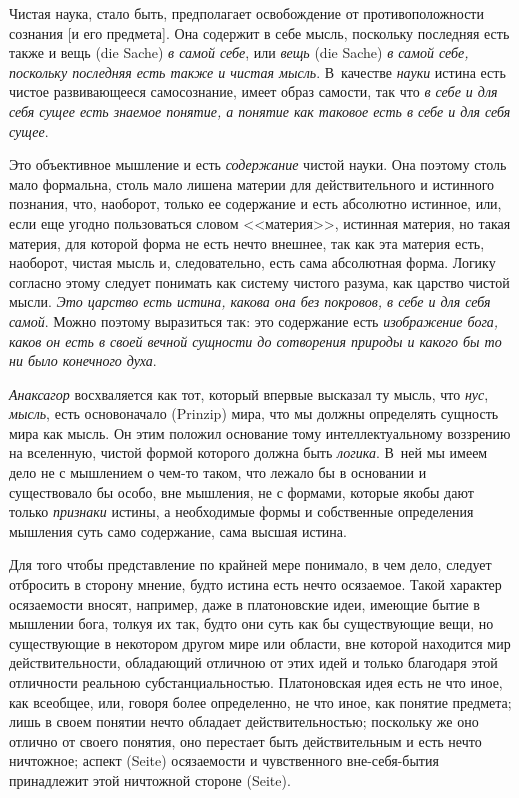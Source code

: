 Чистая наука, стало быть, предполагает освобождение от противоположности
сознания [и его предмета]. Она содержит в себе мысль, поскольку последняя
есть также и вещь (die Sache) {\em в самой себе}, или
{\em вещь} (die Sache) {\em в самой себе, поскольку последняя есть также
и чистая мысль}. В~качестве {\em науки} истина есть чистое развивающееся
самосознание, имеет образ самости, так что {\em в себе и для себя сущее
есть знаемое понятие, а понятие как таковое есть в себе и для себя сущее}.

Это объективное мышление и есть {\em содержание} чистой
науки. Она поэтому столь мало формальна, столь мало лишена материи для
действительного и истинного познания, что, наоборот, только ее содержание и
есть абсолютно истинное, или, если еще угодно пользоваться словом
<<материя>>, истинная материя, но такая материя, для которой форма не есть
нечто внешнее, так как эта материя есть, наоборот, чистая мысль и,
следовательно, есть сама абсолютная форма. Логику согласно этому следует
понимать как систему чистого разума, как царство чистой мысли.
{\em Это царство есть истина, какова она без покровов,
в себе и для себя самой}. Можно поэтому выразиться так: это содержание есть
{\em изображение бога, каков он есть в своей вечной
сущности до сотворения природы и какого бы то ни было конечного духа}.

{\em Анаксагор} восхваляется как тот, который впервые
высказал ту мысль, что {\em нус},
{\em мысль}, есть основоначало (Prinzip) мира, что мы
должны определять сущность мира как мысль. Он этим положил основание тому
интеллектуальному воззрению на вселенную, чистой формой которого должна
быть {\em логика}. В~ней мы имеем дело не с мышлением о
чем-то таком, что лежало бы в основании и существовало бы особо, вне
мышления, не с формами, которые якобы дают только
{\em признаки} истины, а необходимые формы и
собственные определения мышления суть само содержание, сама высшая истина.

Для того чтобы представление по крайней мере понимало, в чем дело, следует
отбросить в сторону мнение, будто истина есть нечто осязаемое. Такой
характер осязаемости вносят, например, даже в платоновские идеи, имеющие
бытие в мышлении бога, толкуя их так, будто они суть как бы существующие
вещи, но существующие в некотором другом мире или области, вне которой
находится мир действительности, обладающий отличною от этих идей и только
благодаря этой отличности реальною субстанциальностью. Платоновская идея
есть не что иное, как всеобщее, или, говоря более определенно, не что иное,
как понятие предмета; лишь в своем понятии нечто обладает
действительностью; поскольку же оно отлично от своего понятия, оно
перестает быть действительным и есть нечто ничтожное; аспект (Seite)
осязаемости и чувственного вне-себя-бытия принадлежит этой ничтожной
стороне (Seite).

